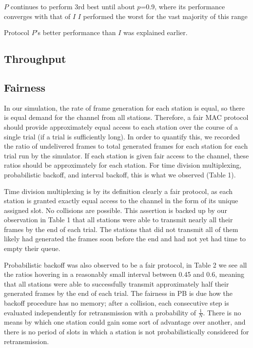 \documentclass[twocolumn]{article}
\begin{document}
$P$ continues to perform 3rd best until about $p$=0.9, where its performance converges with that of $I$
$I$ performed the worst for the vast majority of this range

Protocol $P$'s better performance than $I$ was explained earlier. 

\subsection*{Throughput}

\subsection*{Fairness} 

In our simulation, the rate of frame generation for each station is equal, so there is
equal demand for the channel from all stations. Therefore, a fair MAC protocol should provide
approximately equal access to each station over the course of a single trial (if a trial is
sufficiently long). In order to quantify this, we recorded the ratio of undelivered frames
to total generated frames for each station for each trial run by the simulator. If each station
is given fair access to the channel, these ratios should be approximately for each station. For
time division multiplexing, probabilistic backoff, and interval backoff, this is what we 
observed (Table 1).

Time division multiplexing is by its definition clearly a fair protocol, as each station is 
granted exactly equal access to the channel in the form of its unique assigned slot. No 
collisions are possible. This assertion is backed up by our observation in Table 1 that 
all stations were able to transmit nearly all their frames by the end of each trial. The 
stations that did not transmit all of them likely had generated the frames soon before the 
end and had not yet had time to empty their queue.

Probabilistic backoff was also observed to be a fair protocol, in Table 2 we see all the 
ratios hovering in a reasonably small interval between 0.45 and 0.6, meaning that all stations
were able to successfully transmit approximately half their generated frames by the end of each
trial. The fairness in PB is due how the backoff procedure has no memory; after a collision,
each consecutive step is evaluated independently for retransmission with a probability of 
$\frac{1}{N}$. There is no means by which one station could gain some sort of advantage over
another, and there is no period of slots in which a station is not probabilistically considered
for retransmission.
\end{document}
